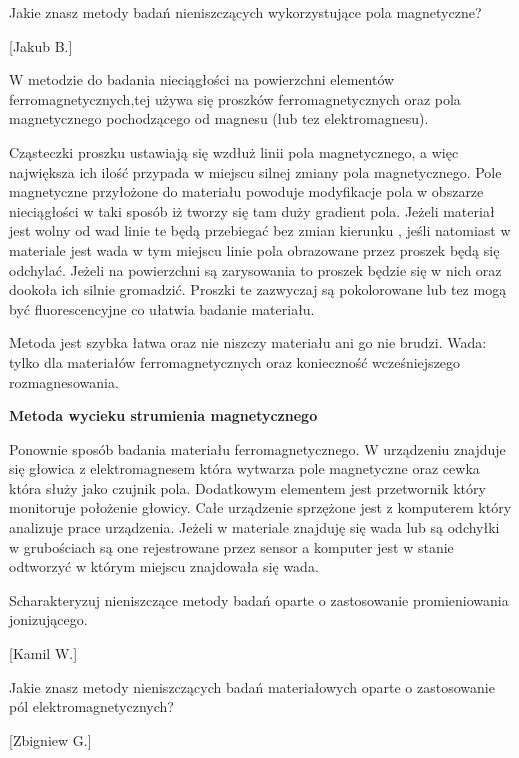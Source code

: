 \documentclass{article}
\begin{document}
\begin{enumerate}
\begin{itemize}
\end{itemize}




{\Large \bf  \item Jakie znasz metody badań nieniszczących wykorzystujące pola magnetyczne?}  [Jakub B.]
 

W metodzie do badania nieciągłości na powierzchni elementów ferromagnetycznych,tej używa się proszków ferromagnetycznych  oraz pola magnetycznego pochodzącego od magnesu (lub tez elektromagnesu). 

Cząsteczki proszku ustawiają się wzdłuż linii pola magnetycznego, a więc największa ich ilość przypada w miejscu silnej zmiany pola magnetycznego. Pole magnetyczne przyłożone do materiału powoduje modyfikacje pola w obszarze nieciągłości w taki sposób iż tworzy się tam duży gradient pola. Jeżeli materiał jest wolny od wad linie te będą przebiegać bez zmian kierunku , jeśli natomiast w materiale jest wada w tym miejscu linie pola obrazowane przez proszek będą się odchylać. 
Jeżeli na powierzchni są zarysowania to proszek będzie się w nich oraz dookoła ich  silnie gromadzić. Proszki te zazwyczaj są pokolorowane lub tez mogą być fluorescencyjne co ułatwia badanie materiału. 

Metoda jest szybka łatwa oraz nie niszczy materiału ani go nie brudzi.
Wada: tylko dla materiałów ferromagnetycznych oraz konieczność wcześniejszego rozmagnesowania. 


{\bf Metoda wycieku strumienia magnetycznego }


Ponownie sposób badania materiału ferromagnetycznego. W urządzeniu znajduje się głowica z elektromagnesem która wytwarza pole magnetyczne oraz cewka która służy jako czujnik pola. Dodatkowym elementem jest przetwornik który monitoruje położenie głowicy. Całe urządzenie sprzężone jest z komputerem który analizuje prace urządzenia. Jeżeli w materiale znajduję się wada lub są odchyłki w grubościach są one rejestrowane przez sensor a komputer jest w stanie odtworzyć w którym miejscu znajdowała się wada. 








{\Large \bf  \item Scharakteryzuj nieniszczące metody badań oparte o zastosowanie promieniowania
jonizującego.} [Kamil W.]

{\Large \bf  \item Jakie znasz metody nieniszczących badań materiałowych oparte o zastosowanie
pól elektromagnetycznych?} [Zbigniew G.]


\end{enumerate}
\end{document}
